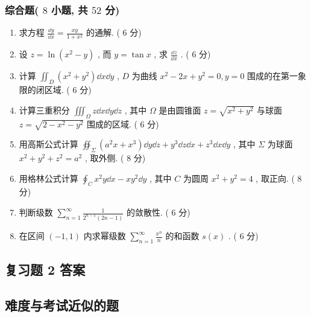\subsubsection{综合题( $8$ 小题, 共 $52$ 分)}
\begin{enumerate}
	\item 求方程 $\frac{\dd y}{\dd x}=\frac{x y}{1+x^{2}}$ 的通解. ( $6$ 分)
	
	\item 设 $z=\ln \left(x^{2}-y\right)$ , 而 $y=\tan x$ , 求 $\frac{\dd z}{\dd x}$ . ( $6$ 分)
	
	\item 计算 $\iint_{D}\left(x^{2}+y^{2}\right) \dd x \dd y$ , $D$ 为曲线 $x^{2}-2 x+y^{2}=0, y=0$ 围成的在第一象限的闭区域. ( $6$ 分)
	
	\item 计算三重积分 $\iiint_{\Omega} z \dd x \dd y \dd z$ , 其中 $\Omega$ 是由圆锥面 $z=\sqrt{x^{2}+y^{2}}$ 与球面 $z=\sqrt{2-x^{2}-y^{2}}$ 围成的区域. ( $6$ 分)
	
	\item 用高斯公式计算 $\oiint_{\Sigma}\left(a^{2} x+x^{3}\right) \dd y \dd z+y^{3} \dd z \dd x+z^{3} \dd x \dd y$ , 其中 $\Sigma$ 为球面 $x^{2}+y^{2}+z^{2}=a^{2}$ , 取外侧. ( $8$ 分)
	
	\item 用格林公式计算 $\oint_{C} x^{2} y \dd x-x y^{2} \dd y$ , 其中 $C$ 为圆周 $x^2+y^2=4$ , 取正向. ( $8$ 分)
	
	\item 判断级数 $\sum_{n=1}^{\infty} \frac{1}{2^{n-1}(2 n-1)}$ 的敛散性. ( $6$ 分)
	
	\item 在区间 $(-1,1)$ 内求幂级数 $\sum_{n=1}^{\infty} \frac{x^{n}}{n}$ 的和函数 $s(x)$ . ( $6$ 分)
\end{enumerate}


\subsection{复习题 2 答案}


\subsection{难度与考试近似的题}
